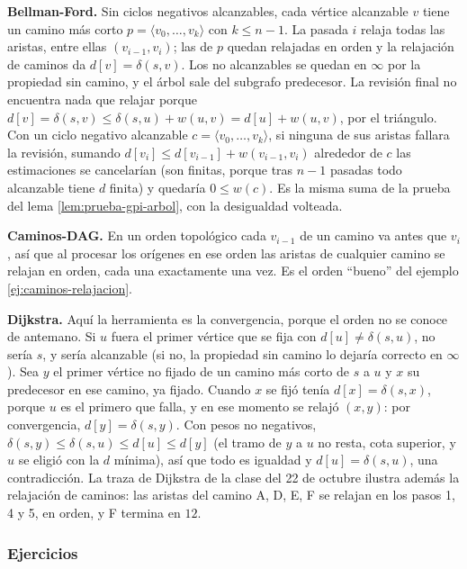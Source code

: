 \documentclass[11pt,letterpaper]{article}
\begin{document}
\textbf{Bellman-Ford.} Sin ciclos negativos alcanzables, cada vértice
alcanzable $v$ tiene un camino más corto
$p = \langle v_0, \dots, v_k \rangle$ con $k \le n - 1$. La pasada $i$
relaja todas las aristas, entre ellas $(v_{i-1}, v_i)$; las de $p$
quedan relajadas en orden y la relajación de caminos da
$d[v] = \delta(s, v)$. Los no alcanzables se quedan en $\infty$ por
la propiedad sin camino, y el árbol sale del subgrafo predecesor. La
revisión final no encuentra nada que relajar porque
$d[v] = \delta(s, v) \le \delta(s, u) + w(u, v) = d[u] + w(u, v)$,
por el triángulo. Con un ciclo negativo alcanzable
$c = \langle v_0, \dots, v_k \rangle$, si ninguna de sus aristas
fallara la revisión, sumando $d[v_i] \le d[v_{i-1}] + w(v_{i-1}, v_i)$
alrededor de $c$ las estimaciones se cancelarían (son finitas, porque
tras $n - 1$ pasadas todo alcanzable tiene $d$ finita) y quedaría
$0 \le w(c)$. Es la misma suma de la prueba del lema
\ref{lem:prueba-gpi-arbol}, con la desigualdad volteada.

\textbf{Caminos-DAG.} En un orden topológico cada $v_{i-1}$ de un
camino va antes que $v_i$, así que al procesar los orígenes en ese
orden las aristas de cualquier camino se relajan en orden, cada una
exactamente una vez. Es el orden ``bueno'' del ejemplo
\ref{ej:caminos-relajacion}.

\textbf{Dijkstra.} Aquí la herramienta es la convergencia, porque el
orden no se conoce de antemano. Si $u$ fuera el primer vértice que se
fija con $d[u] \ne \delta(s, u)$, no sería $s$, y sería alcanzable
(si no, la propiedad sin camino lo dejaría correcto en $\infty$). Sea
$y$ el primer vértice no fijado de un camino más corto de $s$ a $u$ y
$x$ su predecesor en ese camino, ya fijado. Cuando $x$ se fijó tenía
$d[x] = \delta(s, x)$, porque $u$ es el primero que falla, y en ese
momento se relajó $(x, y)$: por convergencia, $d[y] = \delta(s, y)$.
Con pesos no negativos,
$\delta(s, y) \le \delta(s, u) \le d[u] \le d[y]$ (el tramo de $y$ a
$u$ no resta, cota superior, y $u$ se eligió con la $d$ mínima), así
que todo es igualdad y $d[u] = \delta(s, u)$, una contradicción. La
traza de Dijkstra de la clase del 22 de octubre ilustra además la
relajación de caminos: las aristas del camino A, D, E, F se relajan en
los pasos 1, 4 y 5, en orden, y F termina en $12$.

\subsubsection*{Ejercicios}
\end{document}
